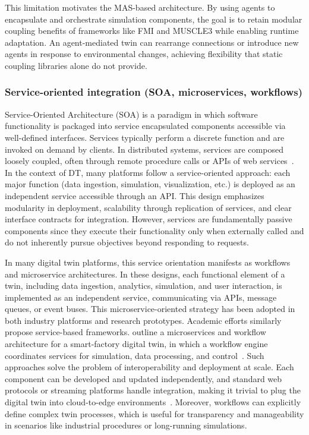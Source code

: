 This limitation motivates the MAS-based architecture. By using agents to encapsulate and orchestrate simulation components, the goal is to retain modular coupling benefits of frameworks like FMI and MUSCLE3 while enabling runtime adaptation. An agent-mediated twin can rearrange connections or introduce new agents in response to environmental changes, achieving flexibility that static coupling libraries alone do not provide.

\subsubsection{Service-oriented integration (SOA, microservices, workflows)}
Service-Oriented Architecture (SOA) is a paradigm in which software functionality is packaged into service encapsulated components accessible via well-defined interfaces. Services typically perform a discrete function  and are invoked on demand by clients. In distributed systems, services are composed loosely coupled, often through remote procedure calls or APIs of web services~\cite{singh2005service}. In the context of DT, many platforms follow a service-oriented approach: each major function (data ingestion, simulation, visualization, etc.) is deployed as an independent service accessible through an API. This design emphasizes modularity in deployment, scalability through replication of services, and clear interface contracts for integration. However, services are fundamentally passive components since they execute their functionality only when externally called and do not inherently pursue objectives beyond responding to requests.

In many digital twin platforms, this service orientation manifests as workflows and microservice architectures. In these designs, each functional element of a twin, including data ingestion, analytics, simulation, and user interaction, is implemented as an independent service, communicating via APIs, message queues, or event buses. This microservice-oriented strategy has been adopted in both industry platforms and research prototypes. Academic efforts similarly propose service-based frameworks. \citeauthor{borodulin2017dtcloud} outline a microservices and workflow architecture for a smart-factory digital twin, in which a workflow engine coordinates services for simulation, data processing, and control~\cite{borodulin2017dtcloud}. Such approaches solve the problem of interoperability and deployment at scale. Each component can be developed and updated independently, and standard web protocols or streaming platforms handle integration, making it trivial to plug the digital twin into cloud-to-edge environments~\cite{bellavista2024microservices_serverless_dt}. Moreover, workflows can explicitly define complex twin processes, which is useful for transparency and manageability in scenarios like industrial procedures or long-running simulations.

